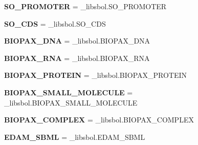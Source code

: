 \begin{DoxyCompactItemize}
\item 
{\bfseries S\+O\+\_\+\+P\+R\+O\+M\+O\+T\+ER} = \+\_\+libsbol.\+S\+O\+\_\+\+P\+R\+O\+M\+O\+T\+ER\hypertarget{namespacesbol_1_1libsbol_a23bb3ef9c3b756b4a3cc923d1dfa89c5}{}\label{namespacesbol_1_1libsbol_a23bb3ef9c3b756b4a3cc923d1dfa89c5}

\item 
{\bfseries S\+O\+\_\+\+C\+DS} = \+\_\+libsbol.\+S\+O\+\_\+\+C\+DS\hypertarget{namespacesbol_1_1libsbol_a807414c5f1d0ef7ab265e8856961a0e2}{}\label{namespacesbol_1_1libsbol_a807414c5f1d0ef7ab265e8856961a0e2}

\item 
{\bfseries B\+I\+O\+P\+A\+X\+\_\+\+D\+NA} = \+\_\+libsbol.\+B\+I\+O\+P\+A\+X\+\_\+\+D\+NA\hypertarget{namespacesbol_1_1libsbol_a5f511276b55d12ad0f7fddc55738e06a}{}\label{namespacesbol_1_1libsbol_a5f511276b55d12ad0f7fddc55738e06a}

\item 
{\bfseries B\+I\+O\+P\+A\+X\+\_\+\+R\+NA} = \+\_\+libsbol.\+B\+I\+O\+P\+A\+X\+\_\+\+R\+NA\hypertarget{namespacesbol_1_1libsbol_ab962f652925a00eeb321f40b66852202}{}\label{namespacesbol_1_1libsbol_ab962f652925a00eeb321f40b66852202}

\item 
{\bfseries B\+I\+O\+P\+A\+X\+\_\+\+P\+R\+O\+T\+E\+IN} = \+\_\+libsbol.\+B\+I\+O\+P\+A\+X\+\_\+\+P\+R\+O\+T\+E\+IN\hypertarget{namespacesbol_1_1libsbol_ae35eb79352a3599a6c8eb6e6daad8267}{}\label{namespacesbol_1_1libsbol_ae35eb79352a3599a6c8eb6e6daad8267}

\item 
{\bfseries B\+I\+O\+P\+A\+X\+\_\+\+S\+M\+A\+L\+L\+\_\+\+M\+O\+L\+E\+C\+U\+LE} = \+\_\+libsbol.\+B\+I\+O\+P\+A\+X\+\_\+\+S\+M\+A\+L\+L\+\_\+\+M\+O\+L\+E\+C\+U\+LE\hypertarget{namespacesbol_1_1libsbol_ab232a91c1eb5261f2153e43201f0ddb4}{}\label{namespacesbol_1_1libsbol_ab232a91c1eb5261f2153e43201f0ddb4}

\item 
{\bfseries B\+I\+O\+P\+A\+X\+\_\+\+C\+O\+M\+P\+L\+EX} = \+\_\+libsbol.\+B\+I\+O\+P\+A\+X\+\_\+\+C\+O\+M\+P\+L\+EX\hypertarget{namespacesbol_1_1libsbol_a36f585c2c1da398df104654efbbaac9d}{}\label{namespacesbol_1_1libsbol_a36f585c2c1da398df104654efbbaac9d}

\item 
{\bfseries E\+D\+A\+M\+\_\+\+S\+B\+ML} = \+\_\+libsbol.\+E\+D\+A\+M\+\_\+\+S\+B\+ML\hypertarget{namespacesbol_1_1libsbol_a27a342e966c91c5f37b25446578707d9}{}\label{namespacesbol_1_1libsbol_a27a342e966c91c5f37b25446578707d9}


\end{DoxyCompactItemize}
